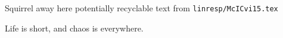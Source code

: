 

Squirrel away here potentially recyclable text from
\texttt{linresp/McICvi15.tex}

Life is short, and chaos is everywhere.
